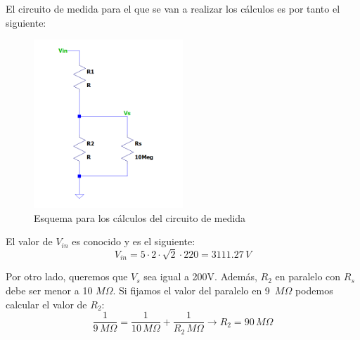 El circuito de medida para el que se van a realizar los cálculos es por tanto el siguiente:
\begin{figure}[H]
    \centering
    \includegraphics[width=0.5\textwidth]{img/circ_medida.png}
    \caption{Esquema para los cálculos del circuito de medida}
    \label{fig:esquema_med}
\end{figure}

El valor de $V_{in}$ es conocido y es el siguiente:
\begin{equation}
    V_{in} = 5\cdot2\cdot\sqrt{2}\cdot220 = 3111.27\,V
\end{equation}

Por otro lado, queremos que $V_s$ sea igual a 200V. Además, $R_2$ en paralelo con $R_s$ debe 
ser menor a 10 $M\Omega$. Si fijamos el valor del paralelo en 9 $\,M\Omega$ podemos calcular 
el valor de $R_2$:
\begin{equation}
    \frac{1}{9\,M\Omega} = \frac{1}{10\,M\Omega} +\frac{1}{R_2\,M\Omega} \rightarrow R_2 = 90\,M\Omega
\end{equation}
